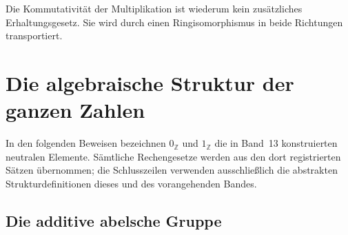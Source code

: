 \documentclass[main.tex]{subfiles}
\begin{document}


Die Kommutativität der Multiplikation ist wiederum kein zusätzliches
Erhaltungsgesetz. Sie wird durch einen Ringisomorphismus in beide Richtungen
transportiert.

\chapter{Die algebraische Struktur der ganzen Zahlen}

In den folgenden Beweisen bezeichnen \(0_{\mathbb Z}\) und
\(1_{\mathbb Z}\) die in Band~13 konstruierten neutralen Elemente. Sämtliche
Rechengesetze werden aus den dort registrierten Sätzen übernommen; die
Schlusszeilen verwenden ausschließlich die abstrakten Strukturdefinitionen
dieses und des vorangehenden Bandes.

\section{Die additive abelsche Gruppe}
\end{document}

